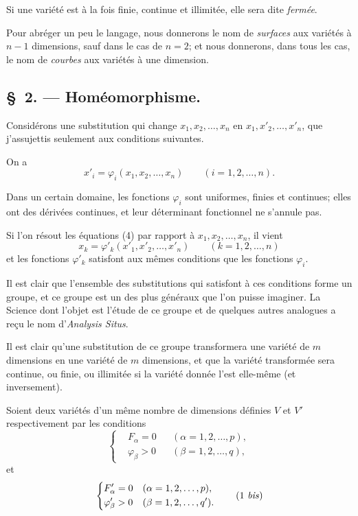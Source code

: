 \documentclass{article}
\begin{document}
Si une variété est à la fois finie, continue et illimitée, elle sera dite \emph{fermée}.

Pour abréger un peu le langage, nous donnerons le nom de \emph{surfaces} aux variétés à $n - 1$ dimensions, sauf dans le cas de $n = 2$; et nous donnerons, dans tous les cas, le nom de \emph{courbes} aux variétés à une dimension.

\subsection*{\S~2. --- Homéomorphisme.}

Considérons une substitution qui change $x_{1}, x_{2}, \ldots, x_{n}$ en $x_{1}, x'_{2}, \ldots, x'_{n}$, que j'assujettis seulement aux conditions suivantes.

On a
\[
x'_{i} = \varphi_{i}(x_{1}, x_{2}, \ldots, x_{n}) \qquad (i = 1, 2, \ldots, n).
\tag{4}
\]

Dans un certain domaine, les fonctions $\varphi_{i}$ sont uniformes, finies et continues; elles ont des dérivées continues, et leur déterminant fonctionnel ne s'annule pas.

Si l'on résout les équations (4) par rapport à $x_{1}, x_{2}, \ldots, x_{n}$, il vient
\[
x_{k} = \varphi'_{k}(x'_{1}, x'_{2}, \ldots, x'_{n}) \qquad (k = 1, 2, \ldots, n)
\]
et les fonctions $\varphi'_{k}$ satisfont aux mêmes conditions que les fonctions $\varphi_{i}$.

Il est clair que l'ensemble des substitutions qui satisfont à ces conditions forme un groupe, et ce groupe est un des plus généraux que l'on puisse imaginer. La Science dont l'objet est l'étude de ce groupe et de quelques autres analogues a reçu le nom d'\emph{Analysis Situs}.

Il est clair qu'une substitution de ce groupe transformera une variété de $m$ dimensions en une variété de $m$ dimensions, et que la variété transformée sera continue, ou finie, ou illimitée si la variété donnée l'est elle-même (et inversement).

Soient deux variétés d'un même nombre de dimensions définies $V$ et $V'$ respectivement par les conditions
\[
\left\{
\begin{aligned}
&F_{\alpha} = 0 &&(\alpha = 1, 2, \ldots, p),\\
&\varphi_{\beta} > 0 &&(\beta = 1, 2, \ldots, q),
\end{aligned}
\right.
\tag{1}
\]
et
\[
\left\{
\begin{aligned}
&F'_{\alpha} = 0 &&(\alpha = 1, 2, \ldots, p),\\
&\varphi'_{\beta} > 0 &&(\beta = 1, 2, \ldots, q').
\end{aligned}
\right.
\tag{1 \textit{bis}}
\]
\end{document}
